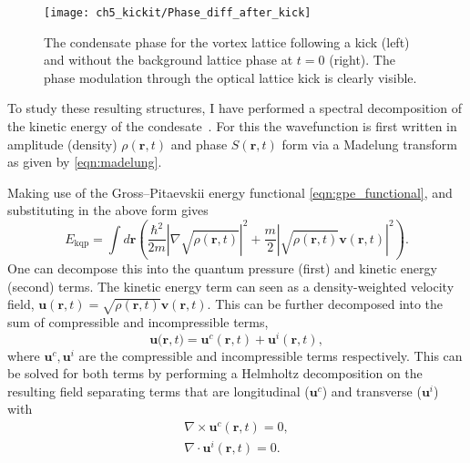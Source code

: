\begin{figure}
    \centering
    \texttt{[image: ch5\_kickit/Phase\_diff\_after\_kick]}
    \caption[Phase modulation following a kick.]{The condensate phase for the vortex lattice following a kick (left) and without the background lattice phase at $t=0$ (right). The phase modulation through the optical lattice kick is clearly visible.}
    \label{fig:Phase_diff_after_kick}
\end{figure}


\iffalse
To study these resulting structures, I have performed a spectral decomposition of the kinetic energy of the condesate~\cite{CT:Nore_prl_1997,CT:Nore_pof_1997,CT:Bradley_prx_2012}. For this the wavefunction is first written in amplitude (density) $\rho(\mathbf{r},t)$ and phase $S(\mathbf{r},t)$ form via a Madelung transform as given by \eqref{eqn:madelung}.
\iffalse
as
$
		\Psi(\mathbf{r},t) = \sqrt{\rho(\mathbf{r},t)}\exp{\left[\mathrm{i}S(\mathbf{r},t)\right]}.
$
\fi
Making use of the Gross--Pitaevskii energy functional \eqref{eqn:gpe_functional}, and substituting in the above form gives
\begin{equation}
    E_{\text{kqp}} = \int d\mathbf{r} \left( \frac{\hbar^2}{2m}| \nabla\sqrt{\rho(\mathbf{r},t)} |^2  + \frac{m}{2}|\sqrt{\rho(\mathbf{r},t)}\mathbf{v}(\mathbf{r},t) |^2\right).
\end{equation}
One can decompose this into the quantum pressure (first) and kinetic energy (second) terms. The kinetic energy term can seen as a density-weighted velocity field, $\mathbf{u}(\mathbf{r},t) = \sqrt{\rho(\mathbf{r},t)}\mathbf{v}(\mathbf{r},t)$. This can be further decomposed into the sum of compressible and incompressible terms,
\begin{equation}\label{eqn:kin_en}
    \mathbf{u(r},t) = \mathbf{u}^c(\mathbf{r},t) + \mathbf{u}^i(\mathbf{r},t),
\end{equation}
where $\mathbf{u}^c, \mathbf{u}^i$ are the compressible and incompressible terms respectively. This can be solved for both terms by performing a Helmholtz decomposition on the resulting field separating terms that are longitudinal ($\mathbf{u}^c$) and transverse ($\mathbf{u}^i$) with
\begin{subequations}\label{eqn:kinterms}
\begin{align}
    \nabla \times \mathbf{u}^c(\mathbf{r},t) = 0, \\
    \nabla \cdot \mathbf{u}^i(\mathbf{r},t) = 0.\\
\end{align}
\end{subequations}
